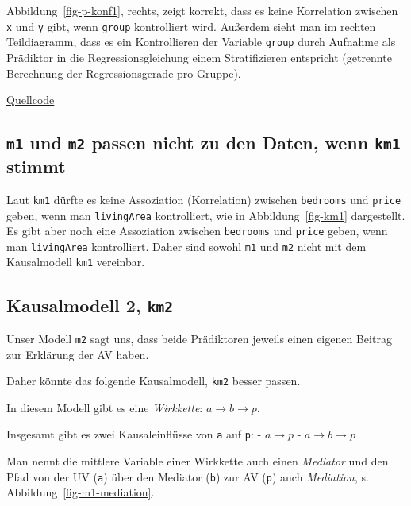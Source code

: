 \documentclass[
  a4paper,
  DIV=11]{scrreprt}
\theoremstyle{definition}
\theoremstyle{remark}
\begin{document}
Abbildung~\ref{fig-p-konf1}, rechts, zeigt korrekt, dass es keine
Korrelation zwischen \texttt{x} und \texttt{y} gibt, wenn \texttt{group}
kontrolliert wird. Außerdem sieht man im rechten Teildiagramm, dass es
ein Kontrollieren der Variable \texttt{group} durch Aufnahme als
Prädiktor in die Regressionsgleichung einem Stratifizieren entspricht
(getrennte Berechnung der Regressionsgerade pro Gruppe).

\href{https://github.com/sebastiansauer/QM2-Folien/blob/main/Themen/children/Konfundierer-kontrollieren.Rmd}{Quellcode}

\hypertarget{m1-und-m2-passen-nicht-zu-den-daten-wenn-km1-stimmt}{%
\subsection{\texorpdfstring{\texttt{m1} und \texttt{m2} passen nicht zu
den Daten, wenn \texttt{km1}
stimmt}{m1 und m2 passen nicht zu den Daten, wenn km1 stimmt}}\label{m1-und-m2-passen-nicht-zu-den-daten-wenn-km1-stimmt}}

Laut \texttt{km1} dürfte es keine Assoziation (Korrelation) zwischen
\texttt{bedrooms} und \texttt{price} geben, wenn man \texttt{livingArea}
kontrolliert, wie in Abbildung~\ref{fig-km1} dargestellt. Es gibt aber
noch eine Assoziation zwischen \texttt{bedrooms} und \texttt{price}
geben, wenn man \texttt{livingArea} kontrolliert. Daher sind sowohl
\texttt{m1} und \texttt{m2} nicht mit dem Kausalmodell \texttt{km1}
vereinbar.

\hypertarget{kausalmodell-2-km2}{%
\subsection{\texorpdfstring{Kausalmodell 2,
\texttt{km2}}{Kausalmodell 2, km2}}\label{kausalmodell-2-km2}}

Unser Modell \texttt{m2} sagt uns, dass beide Prädiktoren jeweils einen
eigenen Beitrag zur Erklärung der AV haben.

Daher könnte das folgende Kausalmodell, \texttt{km2} besser passen.

In diesem Modell gibt es eine \emph{Wirkkette}:
\(a \rightarrow b \rightarrow p\).

Insgesamt gibt es zwei Kausaleinflüsse von \texttt{a} auf \texttt{p}: -
\(a \rightarrow p\) - \(a \rightarrow b \rightarrow p\)

Man nennt die mittlere Variable einer Wirkkette auch einen
\emph{Mediator} und den Pfad von der UV (\texttt{a}) über den Mediator
(\texttt{b}) zur AV (\texttt{p}) auch \emph{Mediation}, s.
Abbildung~\ref{fig-m1-mediation}.
\end{document}

